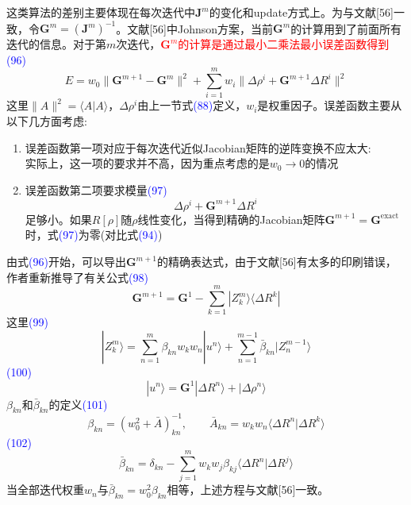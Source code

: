 \documentclass[14pt]{article}      %
\begin{document}
这类算法的差别主要体现在每次迭代中$\mathbf{J}^m$的变化和\textrm{update}方式上。为与文献[56]一致，令$\mathbf{G}^m=(\mathbf{J}^m)^{-1}$。文献[56]中\textrm{Johnson}方案，当前$\mathbf{G}^m$的计算用到了前面所有迭代的信息。对于第$m$次迭代，\textcolor{red}{$\mathbf{G}^m$的计算是通过最小二乘法最小误差函数得到}\textcolor{blue}{(96)}
\begin{displaymath}
	E=w_0\lVert\mathbf{G}^{m+1}-\mathbf{G}^m\lVert^2+\sum_{i=1}^mw_i\lVert\Delta\rho^i+\mathbf{G}^{m+1}\Delta R^i\lVert^2
\end{displaymath}
这里$\lVert A\lVert^2=\langle A|A\rangle$，$\Delta\rho^i$由上一节式\textcolor{blue}{(88)}定义，$w_i$是权重因子。误差函数主要从以下几方面考虑:
\begin{enumerate}
	\item 误差函数第一项对应于每次迭代近似\textrm{Jacobian}矩阵的逆阵变换不应太大:\\
		实际上，这一项的要求并不高，因为重点考虑的是$w_0\rightarrow0$的情况
	\item 误差函数第二项要求模量\textcolor{blue}{(97)}
		\begin{displaymath}
			\Delta\rho^i+\mathbf{G}^{m+1}\Delta R^i
		\end{displaymath}
		足够小。如果$R[\rho]$随$\rho$线性变化，当得到精确的\textrm{Jacobian}矩阵$\mathbf{G}^{m+1}=\mathbf{G}^{\mathrm{exact}}$时，式\textcolor{blue}{(97)}为零(对比式\textcolor{blue}{(94)})
\end{enumerate}

由式\textcolor{blue}{(96)}开始，可以导出$\mathbf{G}^{m+1}$的精确表达式，由于文献[56]有太多的印刷错误，作者重新推导了有关公式\textcolor{blue}{(98)}
\begin{displaymath}
	\mathbf{G}^{m+1}=\mathbf{G}^1-\sum_{k=1}^m|Z_k^m\rangle\langle\Delta R^k|
\end{displaymath}
这里\textcolor{blue}{(99)}
\begin{displaymath}
	|Z_k^m\rangle=\sum_{n=1}^m\beta_{kn}w_kw_n|u^n\rangle+\sum_{n=1}^{m-1}\bar{\beta}_{kn}|Z_n^{m-1}\rangle
\end{displaymath}
\textcolor{blue}{(100)}
\begin{displaymath}
	|u^n\rangle=\mathbf{G}^1|\Delta R^n\rangle+|\Delta\rho^n\rangle
\end{displaymath}
$\beta_{kn}$和$\bar{\beta}_{kn}$的定义\textcolor{blue}{(101)}
\begin{displaymath}
	\beta_{kn}=(w_0^2+\bar{A})_{kn}^{-1},\qquad\bar{A}_{kn}=w_kw_n\langle\Delta R^n|\Delta R^k\rangle
\end{displaymath}
\textcolor{blue}{(102)}
\begin{displaymath}
	\bar{\beta}_{kn}=\delta_{kn}-\sum_{j=1}^mw_kw_j\beta_{kj}\langle\Delta R^n|\Delta R^j\rangle
\end{displaymath}
当全部迭代权重$w_n$与$\bar{\beta}_{kn}=w_0^2\beta_{kn}$相等，上述方程与文献[56]一致。
\end{document}
